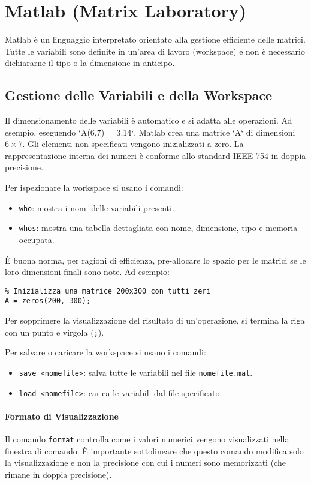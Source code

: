 \section{Matlab (Matrix Laboratory)}
Matlab è un linguaggio interpretato orientato alla gestione efficiente delle matrici. Tutte le variabili sono definite in un'area di lavoro (workspace) e non è necessario dichiararne il tipo o la dimensione in anticipo.

\subsection{Gestione delle Variabili e della Workspace}
Il dimensionamento delle variabili è automatico e si adatta alle operazioni. Ad esempio, eseguendo `A(6,7) = 3.14`, Matlab crea una matrice `A` di dimensioni $6 \times 7$. Gli elementi non specificati vengono inizializzati a zero. La rappresentazione interna dei numeri è conforme allo standard IEEE 754 in doppia precisione.

Per ispezionare la workspace si usano i comandi:
\begin{itemize}
    \item \texttt{who}: mostra i nomi delle variabili presenti.
    \item \texttt{whos}: mostra una tabella dettagliata con nome, dimensione, tipo e memoria occupata.
\end{itemize}

È buona norma, per ragioni di efficienza, pre-allocare lo spazio per le matrici se le loro dimensioni finali sono note. Ad esempio:
\begin{lstlisting}
% Inizializza una matrice 200x300 con tutti zeri
A = zeros(200, 300);
\end{lstlisting}
Per sopprimere la visualizzazione del risultato di un'operazione, si termina la riga con un punto e virgola (\texttt{;}).

Per salvare o caricare la workspace si usano i comandi:
\begin{itemize}
    \item \texttt{save <nomefile>}: salva tutte le variabili nel file \texttt{nomefile.mat}.
    \item \texttt{load <nomefile>}: carica le variabili dal file specificato.
\end{itemize}

\paragraph{Formato di Visualizzazione}
Il comando \texttt{format} controlla come i valori numerici vengono visualizzati nella finestra di comando. È importante sottolineare che questo comando modifica solo la visualizzazione e non la precisione con cui i numeri sono memorizzati (che rimane in doppia precisione).

